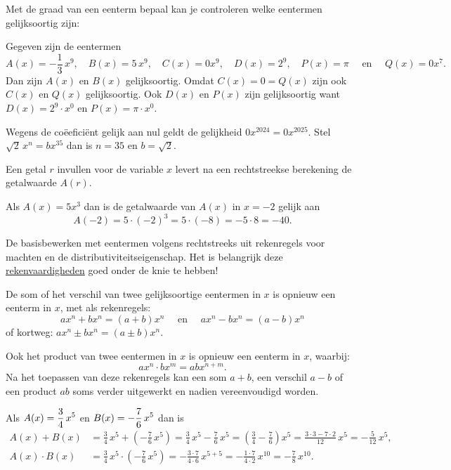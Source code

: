 \documentclass{ximera}
\begin{document}
Met de graad van een eenterm bepaal kan je controleren welke eentermen gelijksoortig zijn: 
\begin{example} 
Gegeven zijn de eentermen
\[
A(x) = -\frac{1}{3}\,x^9, \quad B(x) = 5\,x^9, \quad C(x) = 0x^9, \quad D(x) = 2^9, \quad P(x) = \pi \quad \text{ en } \quad Q(x) = 0 x^7.
\]
Dan zijn $A(x)$ en $B(x)$ gelijksoortig. Omdat $C(x) = 0 = Q(x)$ zijn ook $C(x)$ en $Q(x)$ gelijksoortig. 
Ook $D(x)$ en $P(x)$ zijn gelijksoortig want $D(x) = 2^9 \cdot x^0$ en $P(x) = \pi \cdot x^0$.  
\end{example} 

\begin{example} 
Wegens de coëeficiënt gelijk aan nul geldt de gelijkheid $0x^{2024} = 0x^{2025}$. Stel $\sqrt{2}\,x^n = bx^{35}$ dan is $n = 35$ en $b = \sqrt{2}$.
\end{example} 


Een getal \(r\) invullen voor de variable \(x\) levert na een rechtstreekse berekening de getalwaarde $A(r)$. 
\begin{example} 
Als $A(x) = 5x^3$ dan is de getalwaarde van $A(x)$ in $x = -2$ gelijk aan 
\[
A(-2) = 5 \cdot (-2)^3 = 5 \cdot (-8) = - 5 \cdot 8 = -40.
\]
\end{example} 



De basisbewerken met eentermen volgens rechtstreeks uit rekenregels voor machten en de distributiviteitseigenschap. Het is belangrijk deze \href{https://wiskunde.opmaat.org/wiskundeplan/rekenvaardigheden/rekenvaardigheden/rekenvaardigheden_inleiding}{rekenvaardigheden} goed onder de knie te hebben!  


\begin{proposition}
	
De som of het verschil van twee gelijksoortige eentermen in $x$ is opnieuw een eenterm in $x$, met als rekenregels:
\[
ax^n + bx^n = (a+b)x^n \quad \text{ en } \quad ax^n - bx^n = (a-b)x^n
\]
of kortweg: $ax^n \pm bx^n = (a\pm b)x^n$. 

Ook het product van twee eentermen in $x$ is opnieuw een eenterm in $x$, waarbij:
\[
ax^n \cdot bx^m = abx^{n+m}.
\]
Na het toepassen van deze rekenregels kan een som $a+b$, een verschil $a-b$ of een product $ab$ soms verder uitgewerkt en nadien vereenvoudigd worden.

\end{proposition}


\begin{example} 
Als $\displaystyle A(x) = \frac{3}{4}\,x^5$ en $\displaystyle B(x) = -\frac{7}{6}\,x^5$ dan is 
\begin{align*}
A(x) + B(x) & = \frac{3}{4}\,x^5 + \left(-\frac{7}{6}\,x^5\right) 
= \frac{3}{4}\,x^5 - \frac{7}{6}\,x^5
= \left(\frac{3}{4} - \frac{7}{6}\right)x^5 
= \frac{3 \cdot 3 - 7 \cdot 2}{12}\,x^5 
= -\frac{5}{12}\,x^5, \\
A(x) \cdot B(x) & = \frac{3}{4}\,x^5 \cdot \left(-\frac{7}{6}\,x^5\right) = - \frac{3 \cdot 7}{4 \cdot 6}\,x^{5+5} = -\frac{1\cdot 7}{4 \cdot 2}\, x^{10} = -\frac{7}{8}\,x^{10}. 
\end{align*}
\end{example}
\end{document}
